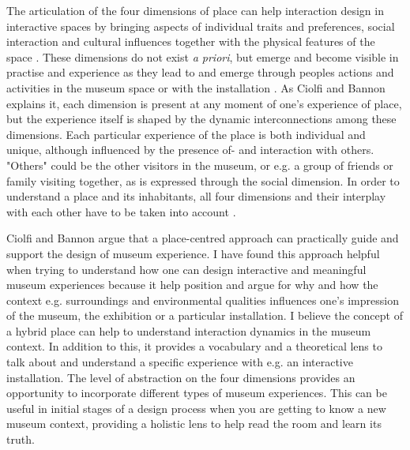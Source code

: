 The articulation of the four dimensions of place can help interaction design in interactive spaces by bringing aspects of individual traits and preferences, social interaction and cultural influences together with the physical features of the space \autocite[p. 163]{hybridplace_ciolfi}. These dimensions do not exist \emph{a priori}, but emerge and become visible in practise and experience as they lead to and emerge through peoples actions and activities in the museum space or with the installation \autocite[p. 163]{hybridplace_ciolfi}. As Ciolfi and Bannon explains it, each dimension is present at any moment of one's experience of place, but the experience itself is shaped by the dynamic interconnections among these dimensions. Each particular experience of the place is both individual and unique, although influenced by the presence of- and interaction with others. "Others" could be the other visitors in the museum, or e.g. a group of friends or family visiting together, as is expressed through the social dimension. In order to understand a place and its inhabitants, all four dimensions and their interplay with each other have to be taken into account \autocite[p. 162]{hybridplace_ciolfi}.

Ciolfi and Bannon argue that a place-centred approach can practically guide and support the design of museum experience. I have found this approach helpful when trying to understand how one can design interactive and meaningful museum experiences because it help position and argue for why and how the context e.g. surroundings and environmental qualities influences one's impression of the museum, the exhibition or a particular installation. I believe the concept of a hybrid place can help to understand interaction dynamics in the museum context. In addition to this, it provides a vocabulary and a theoretical lens to talk about and understand a specific experience with e.g. an interactive installation. The level of abstraction on the four dimensions provides an opportunity to incorporate different types of museum experiences. This can be useful in initial stages of a design process when you are getting to know a new museum context, providing a holistic lens to help read the room and learn its truth. 




